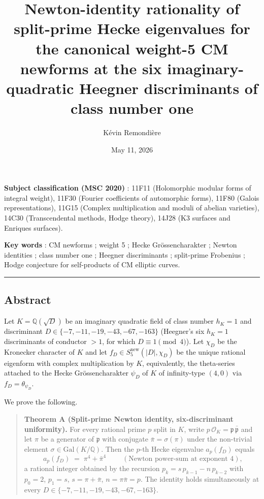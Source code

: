 \documentclass[
  11pt,
  a4paper,
]{amsart}
\title{Newton-identity rationality of split-prime Hecke eigenvalues for the canonical weight-5 CM newforms at the six imaginary-quadratic Heegner discriminants of class number one}
\author{Kévin Remondière}
\date{May 11, 2026}
\begin{document}
\maketitle

\textbf{Subject classification (MSC 2020)} : 11F11 (Holomorphic modular forms of integral weight), 11F30 (Fourier coefficients of automorphic forms), 11F80 (Galois representations), 11G15 (Complex multiplication and moduli of abelian varieties), 14C30 (Transcendental methods, Hodge theory), 14J28 (K3 surfaces and Enriques surfaces).

\textbf{Key words} : CM newforms ; weight 5 ; Hecke Grössencharakter ; Newton identities ; class number one ; Heegner discriminants ; split-prime Frobenius ; Hodge conjecture for self-products of CM elliptic curves.

\begin{center}\rule{0.5\linewidth}{0.5pt}\end{center}

\hypertarget{abstract}{%
\subsection{Abstract}\label{abstract}}

Let \(K = \mathbb{Q}(\sqrt{D})\) be an imaginary quadratic field of class number \(h_K = 1\) and discriminant \(D \in \{-7, -11, -19, -43, -67, -163\}\) (Heegner's six \(h_K = 1\) discriminants of conductor \(> 1\), for which \(D \equiv 1 \pmod 4\)). Let \(\chi_D\) be the Kronecker character of \(K\) and let \(f_D \in S_5^{\mathrm{new}}(|D|, \chi_D)\) be the unique rational eigenform with complex multiplication by \(K\), equivalently, the theta-series attached to the Hecke Grössencharakter \(\psi_D\) of \(K\) of infinity-type \((4, 0)\) via \(f_D = \theta_{\psi_D}\).

We prove the following.

\begin{quote}
\textbf{Theorem A (Split-prime Newton identity, six-discriminant uniformity).} For every rational prime \(p\) split in \(K\), write \(p\,\mathcal{O}_K = \mathfrak{p}\,\bar{\mathfrak{p}}\) and let \(\pi\) be a generator of \(\mathfrak{p}\) with conjugate \(\bar\pi = \sigma(\pi)\) under the non-trivial element \(\sigma \in \mathrm{Gal}(K/\mathbb{Q})\). Then the \(p\)-th Hecke eigenvalue \(a_p(f_D)\) equals
\[
\boxed{\;a_p(f_D) \;=\; \pi^{4} + \bar\pi^{4}\;} \qquad (\text{Newton power-sum at exponent } 4),
\]
a rational integer obtained by the recursion \(p_k = s\,p_{k-1} - n\,p_{k-2}\) with \(p_0 = 2\), \(p_1 = s\), \(s = \pi + \bar\pi\), \(n = \pi\bar\pi = p\). The identity holds simultaneously at every \(D \in \{-7, -11, -19, -43, -67, -163\}\).
\end{quote}
\end{document}
